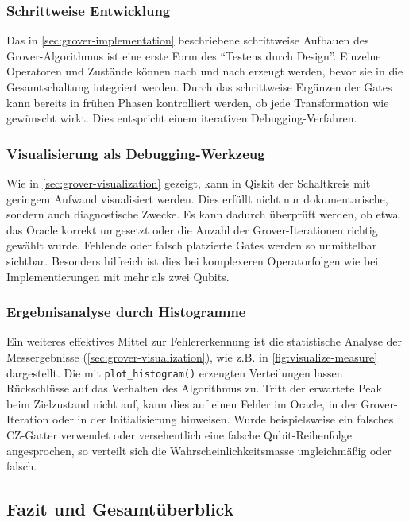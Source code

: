 \subsubsection*{Schrittweise Entwicklung}
Das in \autoref{sec:grover-implementation} beschriebene schrittweise Aufbauen des Grover-Algorithmus ist eine erste Form des \enquote{Testens durch Design}. Einzelne Operatoren und Zustände können nach und nach erzeugt werden, bevor sie in die Gesamtschaltung integriert werden. Durch das schrittweise Ergänzen der Gates kann bereits in frühen Phasen kontrolliert werden, ob jede Transformation wie gewünscht wirkt. Dies entspricht einem iterativen Debugging-Verfahren.

\subsubsection*{Visualisierung als Debugging-Werkzeug}

Wie in \autoref{sec:grover-visualization} gezeigt, kann in Qiskit der Schaltkreis mit geringem Aufwand visualisiert werden. Dies erfüllt nicht nur dokumentarische, sondern auch diagnostische Zwecke. Es kann dadurch überprüft werden, ob etwa das Oracle korrekt umgesetzt oder die Anzahl der Grover-Iterationen richtig gewählt wurde. Fehlende oder falsch platzierte Gates werden so unmittelbar sichtbar. Besonders hilfreich ist dies bei komplexeren Operatorfolgen wie bei Implementierungen mit mehr als zwei Qubits.

\subsubsection*{Ergebnisanalyse durch Histogramme}

Ein weiteres effektives Mittel zur Fehlererkennung ist die statistische Analyse der Messergebnisse (\autoref{sec:grover-visualization}), wie z.B. in \autoref{fig:visualize-measure} dargestellt. Die mit \texttt{plot_histogram()} erzeugten Verteilungen lassen Rückschlüsse auf das Verhalten des Algorithmus zu. Tritt der erwartete Peak beim Zielzustand nicht auf, kann dies auf einen Fehler im Oracle, in der Grover-Iteration oder in der Initialisierung hinweisen. Wurde beispielsweise ein falsches CZ-Gatter verwendet oder versehentlich eine falsche Qubit-Reihenfolge angesprochen, so verteilt sich die Wahrscheinlichkeitsmasse ungleichmäßig oder falsch.

\subsection{Fazit und Gesamtüberblick}

